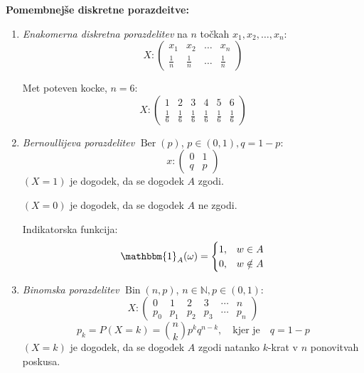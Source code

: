 \documentclass[12pt]{book}
\def\n{\noindent}
\theoremstyle{definition}
\theoremstyle{plain}
\theoremstyle{plain}
\theoremstyle{plain}
\theoremstyle{remark}
\begin{document}
\n \textbf{Pomembnejše diskretne porazdeitve:}

\begin{enumerate}
    \item \emph{Enakomerna diskretna porazdelitev} na $n$ točkah $x_1, x_2, \ldots, x_n$:
    $$
    X:\left(\begin{array}{cccc}
        x_1 & x_2 & \ldots & x_n \\
        \frac{1}{n} & \frac{1}{n} & \ldots & \frac{1}{n}
        \end{array}\right)
    $$
    \begin{zgled}
        Met poteven kocke, $n=6$:
        $$
        X:\left(\begin{array}{cccccc}
            1 & 2 & 3 & 4 & 5 & 6 \\
            \frac{1}{6} & \frac{1}{6} & \frac{1}{6} & \frac{1}{6} & \frac{1}{6}  & \frac{1}{6}
            \end{array}\right)
        $$
    \end{zgled}
    \item \emph{Bernoullijeva porazdelitev} $\operatorname{Ber}(p)$, $p\in (0,1), q = 1-p$:
    $$
    x:\left(\begin{array}{cc}
        0 & 1 \\
        q & p
        \end{array}\right)
    $$
    $(X=1)$ je dogodek, da se dogodek $A$ zgodi.

    $(X=0)$ je dogodek, da se dogodek $A$ ne zgodi. 

    Indikatorska funkcija: 
    $$
    \mathbbm{1}_A(\omega)= \begin{cases}1, & w \in A \\ 0, & w \notin A\end{cases}
    $$
    \item \emph{Binomska porazdelitev} $\operatorname{Bin}(n,p)$, $n \in \mathbb{N}, p \in (0,1)$:
    $$
    X:\left(\begin{array}{cccccc}
        0 & 1 & 2 & 3 & \cdots & n \\
        p_0 & p_1 & p_2 & p_3 & \cdots & p_n
        \end{array}\right)
    $$
    $$
    p_k=P(X=k)=\binom{n}{k} p^k q^{n-k}, \quad \text{kjer je} \quad q = 1-p 
    $$
    $(X=k)$ je dogodek, da se dogodek $A$ zgodi natanko $k$-krat v $n$ ponovitvah poskusa. 


\end{enumerate}
\end{document}
